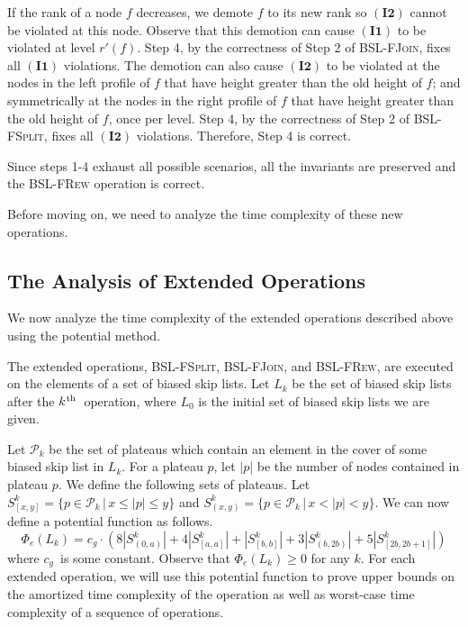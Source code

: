 \documentclass[11pt]{article}
\newcommand{\ens}[1]{\ensuremath{#1}}
\newcommand{\kth}{\ens{k^{ \mbox{\hspace{.2mm}\scriptsize th}}}}
\newcommand{\Bslfspl}{\mbox{\textsc{BSL-FSplit}}}
\newcommand{\Bslfjoin}{\mbox{\textsc{BSL-FJoin}}}
\newcommand{\Bslfrew}{\mbox{\textsc{BSL-FRew}}}
\newcommand{\cons}[1]{\ensuremath{c_{#1}}}
\newcommand{\cnsg}{\cons g}
\newcommand{\invone}{\ensuremath{\mathbf{(I1)}}}
\newcommand{\invtwo}{\ensuremath{\mathbf{(I2)}}}
\newcommand{\nodenewrank}[1]{\ensuremath{r'(\node #1)}}
\newcommand{\node}[1]{\ensuremath{#1}}
\newcommand{\indatast}[1]{\ensuremath{L_{#1}}}
\newcommand{\locpotfun}[1]{\ensuremath{\Phi_{e}(#1)}}
\newcommand{\plasetclosed}[3]{\ensuremath{S_{[#1,#2]}^#3}}
\newcommand{\plasetopen}[3]{\ensuremath{S_{(#1,#2)}^#3}}
\newcommand{\plasetsmall}[1]{\ensuremath{\plasetopen{0}{a}{#1}}}
\newcommand{\plaseta}[1]{\ensuremath{\plasetclosed{a}{a}{#1}}}
\newcommand{\plasetb}[1]{\ensuremath{\plasetclosed{b}{b}{#1}}}
\newcommand{\plasetfat}[1]{\ensuremath{\plasetopen{b}{2b}{#1}}}
\newcommand{\plasetobese}[1]{\ensuremath{\plasetclosed{2b}{2b+1}{#1}}}
\newcommand{\plats}[1]{\ensuremath{\mathcal P_{#1}}}
\begin{document}
If the rank of a node \node f decreases, we demote \node f to its new rank so \invtwo{} cannot be violated at this node. Observe that this demotion can cause \invone{} to be violated at level \nodenewrank f. Step 4, by the correctness of Step 2 of \Bslfjoin{}, fixes all \invone{} violations. The demotion can also cause \invtwo{} to be violated at the nodes in the left profile of \node f that have height greater than the old height of \node f; and symmetrically at the nodes in the right profile of \node f that have height greater than the old height of \node f, once per level. Step 4, by the correctness of Step 2 of \Bslfspl{}, fixes all \invtwo{} violations. Therefore, Step 4 is correct. 

Since steps 1-4 exhaust all possible scenarios, all the invariants are preserved and the \Bslfrew{} operation is correct. 



Before moving on, we need to analyze the time complexity of these new operations. 


\subsection{The Analysis of Extended Operations} 
\label{subsec:BSLAnalysisExtOps} 



We now analyze the time complexity of the extended operations described above using the potential method. 



The extended operations, \Bslfspl{}, \Bslfjoin{}, and \Bslfrew{}, are executed on the elements of a set of biased skip lists. Let \indatast k be the set of biased skip lists after the \kth\ operation, where \indatast 0 is the initial set of biased skip lists we are given. 

Let \plats k be the set of plateaus which contain an element in the cover of some biased skip list in \indatast{k}. For a plateau $p$, let $|p|$ be the number of nodes contained in plateau $p$. We define the following sets of plateaus. Let $\plasetclosed{x}{y}{k} = \{p\in \plats k\,|\, x\leq |p|\leq y \}$ and $\plasetopen{x}{y}{k} = \{p\in \plats k\,|\, x< |p|< y \}$. 
We can now define a potential function as follows. 
\[ 
\locpotfun{\indatast k} = \cnsg\cdot(8|\plasetsmall k| + 4|\plaseta k| + |\plasetb k| + 3|\plasetfat k| + 5|\plasetobese k|)
\] 
where \cnsg\ is some constant. Observe that $\locpotfun{\indatast k}\geq 0$ for any $k$. 
For each extended operation, we will use this potential function to prove upper bounds on the amortized time complexity of the operation as well as worst-case time complexity of a sequence of operations. 
\end{document}
